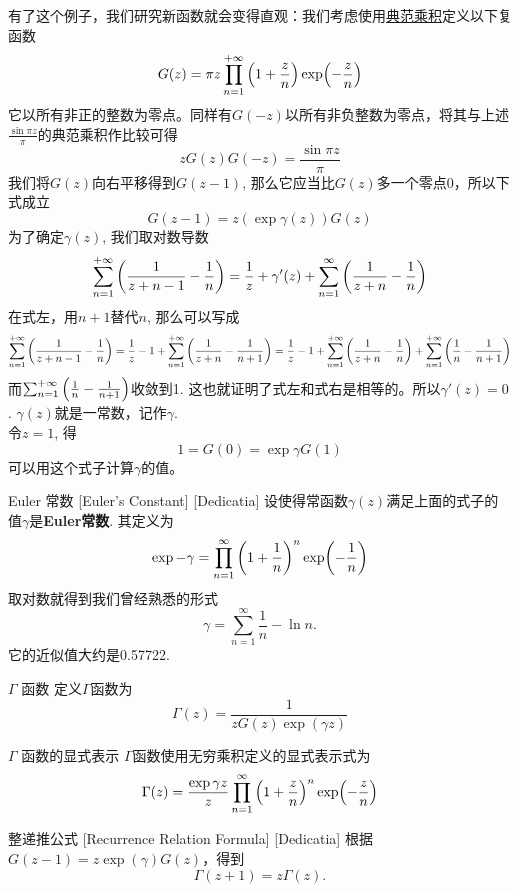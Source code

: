         有了这个例子，我们研究新函数就会变得直观：我们考虑使用\hyperref[dfn:Canonical-Product]{典范乘积}定义以下复函数
        \[G(z)=\pi z\prod_{n=1}^{+\infty}\qty(1+\frac{z}{n})\exp(-\frac{z}{n})\]
        它以所有非正的整数为零点。同样有$G(-z)$以所有非负整数为零点，将其与上述$\frac{\sin\pi z}{\pi}$的典范乘积作比较可得
        \[zG(z)G(-z)=\frac{\sin\pi z}{\pi}\]
        我们将$G(z)$向右平移得到$G(z-1)$, 那么它应当比$G(z)$多一个零点0，所以下式成立
        \[G(z-1)=z(\exp\gamma(z))G(z)\]
        为了确定$\gamma(z)$, 我们取对数导数
        \[\sum_{n=1}^{+\infty}\qty(\frac{1}{z+n-1}-\frac{1}{n})=\frac{1}{z}+\gamma'(z)+\sum_{n=1}^{\infty}\qty(\frac{1}{z+n}-\frac{1}{n})\]
        在式左，用$n+1$替代$n$, 那么可以写成
        \[\sum_{n=1}^{+\infty}\qty(\frac{1}{z+n-1}-\frac{1}{n})=\frac{1}{z}-1+\sum_{n=1}^{+\infty}\qty(\frac{1}{z+n}-\frac{1}{n+1})=\frac{1}{z}-1+\sum_{n=1}^{+\infty}\qty(\frac{1}{z+n}-\frac{1}{n})+\sum_{n=1}^{+\infty}\qty(\frac{1}{n}-\frac{1}{n+1})\]
        而$\sum_{n=1}^{+\infty}\qty(\frac{1}{n}-\frac{1}{n+1})$收敛到1. 这也就证明了式左和式右是相等的。所以$\gamma'(z)=0$. $\gamma(z)$就是一常数，记作$\gamma$.\\
        令$z=1$, 得
        \[1=G(0)=\exp\gamma G(1)\]
        可以用这个式子计算$\gamma$的值。

        \begin{dfn}
            {Euler 常数}
            [Euler's Constant]
            [Dedicatia]
            设使得常函数$\gamma(z)$满足上面的式子的值$\gamma$是\textbf{Euler常数}. 其定义为
            \[\exp -\gamma=\prod_{n=1}^{\infty}\qty(1+\frac{1}{n})^n\exp(-\frac{1}{n})\]
            取对数就得到我们曾经熟悉的形式
            \[\gamma=\sum_{n=1}^{\infty}\frac{1}{n}-\ln n.\]
            它的近似值大约是0.57722.
        \end{dfn}

        \begin{dfn}
            {\(\Gamma\) 函数}
            定义$\Gamma$函数为
            \[\Gamma(z)=\frac{1}{zG(z)\exp(\gamma z)}\]
        \end{dfn}

        \begin{dfn}
            {\(\Gamma\) 函数的显式表示}
            $\Gamma$函数使用无穷乘积定义的显式表示式为
            \[\Gamma(z)=\frac{\exp\gamma z}{z}\prod_{n=1}^{\infty}\qty(1+\frac{z}{n})^n\exp(-\frac{z}{n})\]
        \end{dfn}

        \begin{ppt}
            {整递推公式}
            [Recurrence Relation Formula]
            [Dedicatia]
            根据$G(z-1)=z\exp(\gamma)G(z)$，得到
            \[\Gamma(z+1)=z\Gamma(z).\]
        \end{ppt}

